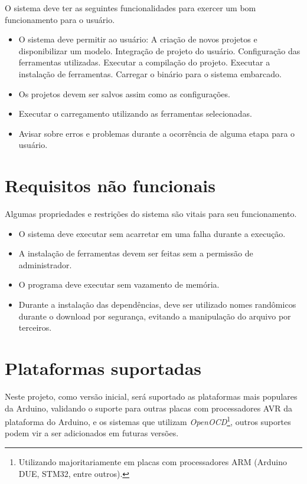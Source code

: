 O sistema deve ter as seguintes funcionalidades para exercer um bom funcionamento para o usuário.
\begin{itemize}
\item O sistema deve permitir ao usuário:
	\subitem A criação de novos projetos e disponibilizar um modelo.
	\subitem Integração de projeto do usuário.
    \subitem Configuração das ferramentas utilizadas.
	\subitem Executar a compilação do projeto.
	\subitem Executar a instalação de ferramentas.
	\subitem Carregar o binário para o sistema embarcado.
\item Os projetos devem ser salvos assim como as configurações.
\item Executar o carregamento utilizando as ferramentas selecionadas.
\item Avisar sobre erros e problemas durante a ocorrência de alguma etapa para o usuário.	
\end{itemize}

\section{Requisitos não funcionais}
Algumas propriedades e restrições do sistema são vitais para seu funcionamento.
\begin{itemize}
\item O sistema deve executar sem acarretar em uma falha durante a execução.
\item A instalação de ferramentas devem ser feitas sem a permissão de administrador.
\item O programa deve executar sem vazamento de memória.
\item Durante a instalação das dependências, deve ser utilizado nomes randômicos durante o download por segurança, evitando a manipulação do arquivo por terceiros.
\end{itemize}

\section{Plataformas suportadas}

Neste projeto, como versão inicial, será suportado as plataformas mais populares da Arduino, validando o suporte para outras placas com processadores AVR da plataforma do Arduino, e os sistemas que utilizam \textit{OpenOCD}\footnote{Utilizando majoritariamente em placas com processadores ARM (Arduino DUE, STM32, entre outros).}, outros suportes podem vir a ser adicionados em futuras versões.


